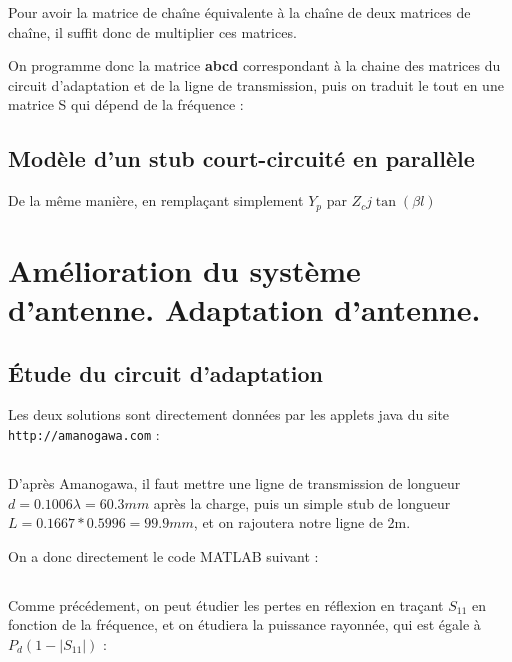 \documentclass[10pt]{article}
\begin{document}
\begin{itemize}
        Pour avoir la matrice de chaîne équivalente à la chaîne de deux matrices de chaîne, il suffit donc de multiplier ces matrices.

        On programme donc la matrice \textbf{abcd} correspondant à la chaine des matrices du circuit d'adaptation et de la ligne de transmission, puis on traduit le tout en une matrice S qui dépend de la fréquence : 

        \newpage


\end{itemize}

\subsection{Modèle d'un stub court-circuité en parallèle}
De la même manière, en remplaçant simplement $Y_p$ par $Z_c j \tan(\beta l)$

%


\section{Amélioration du système d'antenne. Adaptation d'antenne.}
\subsection{Étude du circuit d'adaptation}
Les deux solutions sont directement données par les applets java du site \verb|http://amanogawa.com| :

\begin{center}

\end{center}
\subsection{}

D'après Amanogawa, il faut mettre une ligne de transmission de longueur $d=0.1006 \lambda = 60.3mm$ après la charge, puis un simple stub de longueur $L=0.1667*0.5996=99.9mm$, et on rajoutera notre ligne de 2m.

On a donc directement le code MATLAB suivant :

%

\subsection{}
Comme précédement, on peut étudier les pertes en réflexion en traçant $S_{11}$ en fonction de la fréquence, et on étudiera la puissance rayonnée, qui est égale à $P_d(1-|S_{11}|)$ :

%
\end{document}

